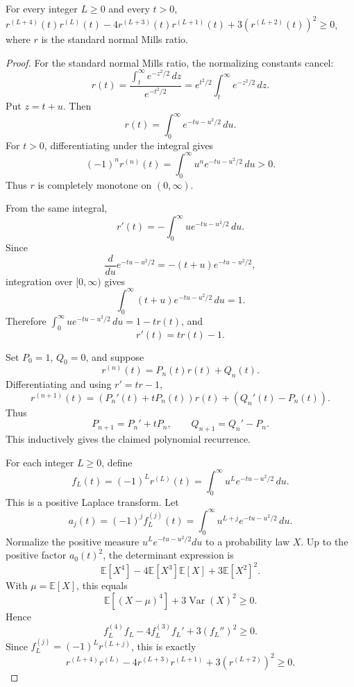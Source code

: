 \begin{theorem}
\label{res:from-mills-derivative-determinant-all-l}
For every integer \(L\ge0\) and every \(t>0\), \(r^{(L+4)}(t)r^{(L)}(t)-4r^{(L+3)}(t)r^{(L+1)}(t)+3(r^{(L+2)}(t))^2\ge0\), where \(r\) is the standard normal Mills ratio.
\end{theorem}
\begin{proof}
For the standard normal Mills ratio, the normalizing constants cancel:
\[
r(t)=\frac{\int_t^\infty e^{-z^2/2}\,dz}{e^{-t^2/2}}
=e^{t^2/2}\int_t^\infty e^{-z^2/2}\,dz.
\]
Put \(z=t+u\). Then
\[
r(t)=\int_0^\infty e^{-tu-u^2/2}\,du.
\]
For \(t>0\), differentiating under the integral gives
\[
(-1)^n r^{(n)}(t)=\int_0^\infty u^n e^{-tu-u^2/2}\,du>0.
\]
Thus \(r\) is completely monotone on \((0,\infty)\).

From the same integral,
\[
r'(t)=-\int_0^\infty u e^{-tu-u^2/2}\,du.
\]
Since
\[
\frac{d}{du}e^{-tu-u^2/2}=-(t+u)e^{-tu-u^2/2},
\]
integration over \([0,\infty)\) gives
\[
\int_0^\infty (t+u)e^{-tu-u^2/2}\,du=1.
\]
Therefore \(\int_0^\infty u e^{-tu-u^2/2}\,du=1-tr(t)\), and
\[
r'(t)=tr(t)-1.
\]

Set \(P_0=1\), \(Q_0=0\), and suppose
\[
r^{(n)}(t)=P_n(t)r(t)+Q_n(t).
\]
Differentiating and using \(r'=tr-1\),
\[
r^{(n+1)}(t)=(P_n'(t)+tP_n(t))r(t)+(Q_n'(t)-P_n(t)).
\]
Thus
\[
P_{n+1}=P_n'+tP_n,\qquad Q_{n+1}=Q_n'-P_n.
\]
This inductively gives the claimed polynomial recurrence.

For each integer \(L\ge0\), define
\[
f_L(t)=(-1)^L r^{(L)}(t)=\int_0^\infty u^L e^{-tu-u^2/2}\,du.
\]
This is a positive Laplace transform. Let
\[
a_j(t)=(-1)^j f_L^{(j)}(t)=\int_0^\infty u^{L+j}e^{-tu-u^2/2}\,du.
\]
Normalize the positive measure \(u^L e^{-tu-u^2/2}du\) to a probability law \(X\). Up to the positive factor \(a_0(t)^2\), the determinant expression is
\[
\mathbb E[X^4]-4\mathbb E[X^3]\mathbb E[X]+3\mathbb E[X^2]^2.
\]
With \(\mu=\mathbb E[X]\), this equals
\[
\mathbb E[(X-\mu)^4]+3\operatorname{Var}(X)^2\ge0.
\]
Hence
\[
f_L^{(4)}f_L-4f_L^{(3)}f_L'+3(f_L'')^2\ge0.
\]
Since \(f_L^{(j)}=(-1)^L r^{(L+j)}\), this is exactly
\[
r^{(L+4)}r^{(L)}-4r^{(L+3)}r^{(L+1)}+3(r^{(L+2)})^2\ge0.
\]
\end{proof}

